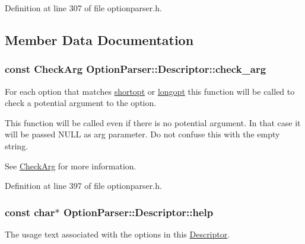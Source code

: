 Definition at line 307 of file optionparser.\-h.



\subsection{Member Data Documentation}
\hypertarget{struct_option_parser_1_1_descriptor_aac19c7bd3a84282211edd0331c92a44a}{
\subsubsection[{check\-\_\-arg}]{\setlength{\rightskip}{0pt plus 5cm}const {\bf Check\-Arg} Option\-Parser\-::\-Descriptor\-::check\-\_\-arg}}\label{struct_option_parser_1_1_descriptor_aac19c7bd3a84282211edd0331c92a44a}


For each option that matches \hyperlink{struct_option_parser_1_1_descriptor_a21415d74531b006e9a7a06ccadbd2721}{shortopt} or \hyperlink{struct_option_parser_1_1_descriptor_ab9db8207bae68dd5c4ee83e05189a9d0}{longopt} this function will be called to check a potential argument to the option. 

This function will be called even if there is no potential argument. In that case it will be passed {\ttfamily N\-U\-L\-L} as {\ttfamily arg} parameter. Do not confuse this with the empty string.

See \hyperlink{namespace_option_parser_aee9955553cc70fd9fd41849622680c6a}{Check\-Arg} for more information. 

Definition at line 397 of file optionparser.\-h.

\hypertarget{struct_option_parser_1_1_descriptor_ad281343957d1b5c1d617306479788f13}{
\subsubsection[{help}]{\setlength{\rightskip}{0pt plus 5cm}const char$\ast$ Option\-Parser\-::\-Descriptor\-::help}}\label{struct_option_parser_1_1_descriptor_ad281343957d1b5c1d617306479788f13}


The usage text associated with the options in this \hyperlink{struct_option_parser_1_1_descriptor}{Descriptor}. 

